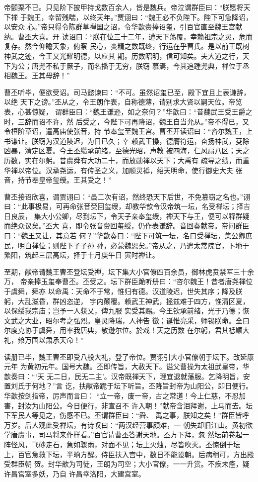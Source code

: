 帝颤栗不已。只见阶下披甲持戈数百余人，皆是魏兵。帝泣谓群臣曰：“朕愿将天下禅
于魏王，幸留残喘，以终天年。”贾诩曰：“魏王必不负陛下。陛下可急降诏，以安众
心。”帝只得令陈群草禅国之诏，令华歆赍捧诏玺，引百官直至魏王宫献纳。曹丕大喜。开
读诏曰：“朕在位三十二年，遭天下荡覆，幸赖祖宗之灵，危而复存。然今仰瞻天象，俯察
民心，炎精之数既终，行运在乎曹氏。是以前王既树神武之迹，今王又光耀明德，以应其
期。历数昭明，信可知矣。夫大道之行，天下为公；唐尧不私于厥子，而名播于无穷，朕窃
慕焉，今其追踵尧典，禅位于丞相魏王。王其毋辞！”

曹丕听毕，便欲受诏。司马懿谏曰：“不可。虽然诏玺已至，殿下宜且上表谦辞，以绝
天下之谤。”丕从之，令王朗作表，自称德薄，请别求大贤以嗣天位。帝览表，心甚惊疑，
谓群臣曰：“魏王谦逊，如之奈何？”华歆曰：“昔魏武王受王爵之时，三辞而诏不许，然
后受之，今陛下可再降诏，魏王自当允从。”帝不得已，又令桓阶草诏，遣高庙使张音，持
节奉玺至魏王宫。曹丕开读诏曰：“咨尔魏王，上书谦让。朕窃为汉道陵迟，为日已久；幸
赖武王操，德膺符运，奋扬神武，芟除凶暴，清定区夏。今王丕缵承前绪，至德光昭，声教
被四海，仁风扇八区；天之历数，实在尔躬。昔虞舜有大功二十，而放勋禅以天下；大禹有
疏导之绩，而重华禅以帝位。汉承尧运，有传圣之义，加顺灵袛，绍天明命，使行御史大夫
张音，持节奉皇帝玺绶。王其受之！”

曹丕接诏欣喜，谓贾诩曰：“虽二次有诏，然终恐天下后世，不免篡窃之名也。”诩
曰：“此事极易，可再命张音赍回玺绶，却教华歆令汉帝筑一坛，名受禅坛；择吉日良辰，
集大小公卿，尽到坛下，令天子亲奉玺绶，禅天下与王，便可以释群疑而绝众议矣。”丕大
喜，即令张音赍回玺绶，仍作表谦辞。音回奏献帝。帝问群臣曰：“魏王又让，其意若
何？”华歆奏曰：“陛下可筑一坛，名曰受禅坛，集公卿庶民，明白禅位；则陛下子子孙
孙，必蒙魏恩矣。”帝从之，乃遣太常院官，卜地于繁阳，筑起三层高坛，择于十月庚午日
寅时禅让。

至期，献帝请魏王曹丕登坛受禅，坛下集大小官僚四百余员，御林虎贲禁军三十余万，
帝亲捧玉玺奉曹丕。丕受之。坛下群臣跪听册曰：“咨尔魏王！昔者唐尧禅位于虞舜，舜亦
以命禹：天命不于常，惟归有德。汉道陵迟，世失其序；降及朕躬，大乱滋昏，群凶恣逆，
宇内颠覆。赖武王神武，拯兹难于四方，惟清区夏，以保绥我宗庙；岂予一人获乂，俾九服
实受其赐。今王钦承前绪，光于乃德；恢文武之大业，昭尔考之弘烈。皇灵降瑞，人神告
徵；诞惟亮采，师锡朕命。全曰尔度克协于虞舜，用率我唐典，敬逊尔位。於戏！天之历数
在尔躬，君其袛顺大礼，飨万国以肃承天命！”

读册已毕，魏王曹丕即受八般大礼，登了帝位。贾诩引大小官僚朝于坛下。改延康元年
为黄初元年。国号大魏。丕即传旨，大赦天下。谥父曹操为太祖武皇帝，华歆奏曰：“‘天
无二日，民无二主’。汉帝既禅天下，理宜退就藩服。乞降明旨，安置刘氏于何地？”言
讫，扶献帝跪于坛下听旨。丕降旨封帝为山阳公，即日便行。华歆按剑指帝，厉声而言曰：
“立一帝，废一帝，古之常道！今上仁慈，不忍加害，封汝为山阳公。今日便行，非宣召不
许入朝！”献帝含泪拜谢，上马而去。坛下军民人等见之，伤感不已。丕谓群臣曰：“舜、
禹之事，朕知之矣！”群臣皆呼万岁。后人观此受禅坛，有诗叹曰：“两汉经营事颇难，一
朝失却旧江山。黄初欲学唐虞事，司马将来作样看。”百官请曹丕答谢天地。丕方下拜，忽
然坛前卷起一阵怪风，飞砂走石，急如骤雨，对面不见；坛上火烛，尽皆吹灭。丕惊倒于坛
上，百官急救下坛，半晌方醒。侍臣扶入宫中，数日不能设朝。后病稍可，方出殿受群臣朝
贺。封华歆为司徒，王朗为司空；大小官僚，一一升赏。不疾未痊，疑许昌宫室多妖，乃自
许昌幸洛阳，大建宫室。

